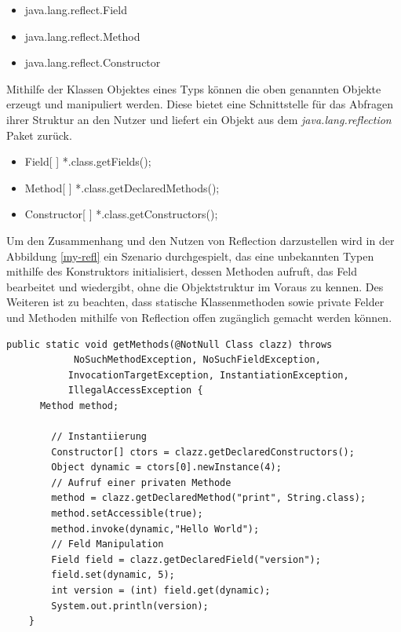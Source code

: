   \begin{itemize}
    \item java.lang.reflect.Field
    \item java.lang.reflect.Method
    \item java.lang.reflect.Constructor
  \end{itemize}

  Mithilfe der Klassen Objektes eines Typs können die oben genannten Objekte erzeugt und manipuliert werden. Diese bietet eine Schnittstelle für das Abfragen ihrer Struktur an den Nutzer und liefert ein Objekt aus dem \textit{java.lang.reflection} Paket zurück.

  \begin{itemize}
    \item Field[ ] *.class.getFields();
    \item Method[ ] *.class.getDeclaredMethods();
    \item Constructor[ ] *.class.getConstructors();
  \end{itemize}
  \bigbreak 

  Um den Zusammenhang und den Nutzen von Reflection darzustellen wird in der Abbildung \ref{my-refl} ein Szenario durchgespielt, das eine unbekannten Typen mithilfe des Konstruktors initialisiert, dessen Methoden aufruft, das Feld bearbeitet und wiedergibt, ohne die Objektstruktur im Voraus zu kennen. Des Weiteren ist zu beachten, dass statische Klassenmethoden sowie private Felder und Methoden mithilfe von Reflection offen zugänglich gemacht werden können.\cite{Forman04javareflection}\bigbreak 

  \begin{lstlisting}[caption=Reflection in Aktion,label=my-refl,captionpos=b]
    public static void getMethods(@NotNull Class clazz) throws
            NoSuchMethodException, NoSuchFieldException,
           InvocationTargetException, InstantiationException,
           IllegalAccessException {
      Method method;

        // Instantiierung
        Constructor[] ctors = clazz.getDeclaredConstructors();
        Object dynamic = ctors[0].newInstance(4);
        // Aufruf einer privaten Methode
        method = clazz.getDeclaredMethod("print", String.class);
        method.setAccessible(true);
        method.invoke(dynamic,"Hello World");
        // Feld Manipulation
        Field field = clazz.getDeclaredField("version");
        field.set(dynamic, 5);
        int version = (int) field.get(dynamic);
        System.out.println(version);
    }
  \end{lstlisting}

